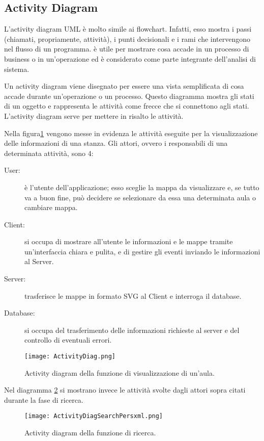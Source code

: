 \subsection{Activity Diagram}
L’activity diagram UML è molto simile ai flowchart. Infatti, esso mostra i passi (chiamati, propriamente, attività), i punti decisionali e i rami che intervengono nel flusso di un programma. è utile per mostrare cosa accade in un processo di business o in un’operazione ed è considerato come parte integrante dell’analisi di sistema.

Un activity diagram viene disegnato per essere una vista semplificata di cosa accade durante un’operazione o un processo. Questo diagramma mostra gli stati di un oggetto e rappresenta le attività come frecce che si connettono agli stati. L’activity diagram serve per mettere in risalto le attività.

Nella figura\ref{fig:umlActDVisu} vengono messe in evidenza le attività eseguite per la visualizzazione delle informazioni di una stanza. Gli attori, ovvero i responsabili di una determinata attività, sono 4:
\begin{description}
\item[User:]è l'utente dell'applicazione; esso sceglie la mappa da visualizzare e, se tutto va a buon fine, può decidere se selezionare da essa una determinata aula o cambiare mappa.
\item[Client:]si occupa di mostrare all'utente le informazioni e le mappe tramite un'interfaccia chiara e pulita, e di gestire gli eventi inviando le informazioni al Server.
\item[Server:]trasferisce le mappe in formato SVG al Client e  interroga il database.
\item[Database:]si occupa del trasferimento delle informazioni richieste al server e del controllo di eventuali errori.
\end{description}

\begin{figure}[!htb]
\centering%
\texttt{[image: ActivityDiag.png]}%
\caption{Activity diagram della funzione di visualizzazione di un'aula.}\label{fig:umlActDVisu}%
\end{figure}
\FloatBarrier
Nel diagramma \ref{fig:umlActDSearch} si mostrano invece le attività svolte dagli attori sopra citati durante la fase di ricerca. 
\begin{figure}[!htb]
\centering%
\texttt{[image: ActivityDiagSearchPersxml.png]}
\caption{Activity diagram della funzione di ricerca.}\label{fig:umlActDSearch}%
\end{figure}
\FloatBarrier
